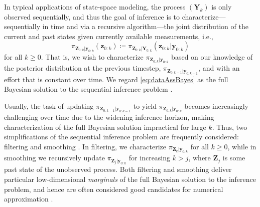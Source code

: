 \documentclass[twoside,11pt]{article}
\newcommand{\Yb}{\boldsymbol{Y}}
\newcommand{\yb}{\boldsymbol{y}}
\newcommand{\Zb}{\boldsymbol{Z}}
\newcommand{\zb}{\boldsymbol{z}}
\begin{document}
In typical applications of state-space modeling, the process
$(\Yb_k)$ is only observed sequentially, and thus the goal of
inference is to characterize---{sequentially} in time and via a
{recursive} algorithm---the joint distribution of the current and past states
given currently available measurements, i.e.,
  \begin{equation} \label{eq:dataAssBayes}
%
  \pi_{\Zb_{0:k}  \vert  \yb_{0:k}}( \zb_{0:k} )
  \coloneqq 
    \pi_{\Zb_{0:k} \vert  
    \Yb_{0:k}}( \zb_{0:k} \vert \yb_{0:k} )   
  \end{equation}
for all $k\ge0$. 
%
%
%
%
%
That is, we wish to characterize %
$\pi_{\Zb_{0:k} \vert \yb_{0:k}}$
based on our knowledge of the posterior distribution at the previous timestep,
$\pi_{\Zb_{0:k-1} \vert \yb_{0:k-1}}$, and with an effort that is
constant over time.
We regard \eqref{eq:dataAssBayes} as the full Bayesian
solution to the sequential inference problem \citep{sarkka2013bayesian}. 

Usually, the task of updating $\pi_{\Zb_{0:k-1} \vert \yb_{0:k-1}}$
to yield $\pi_{\Zb_{0:k} \vert \yb_{0:k}}$
%
%
becomes increasingly challenging over time due to the widening
inference horizon, making characterization of the full Bayesian
solution impractical for large $k$. %
%
%
%
%
%
%
Thus, two simplifications of the sequential inference problem are
frequently considered: filtering and smoothing
\citep{sarkka2013bayesian}.  In filtering, we characterize
%
%
%
%
%
$\pi_{\Zb_{k} \vert \yb_{0:k}}$ for all $k\ge 0$, while in
smoothing we recursively
update $\pi_{\Zb_{j} \vert \yb_{0:k}}$
for increasing $k>j$, where $\Zb_j$ is some past
state of the unobserved process.
Both  filtering and  smoothing deliver
particular low-dimensional
\emph{marginals} of the full Bayesian solution to the inference problem, and
hence are often considered good candidates
for numerical approximation \citep{doucet2009tutorial}.%
\end{document}

